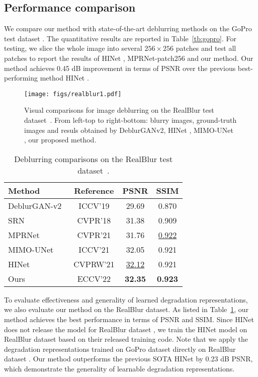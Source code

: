 \documentclass[runningheads]{llncs}
\begin{document}
\subsection{Performance comparison}


We compare our method with state-of-the-art deblurring methods \cite{HINet,Zamir2021MPRNet,MIMO_UNet} on the GoPro test dataset \cite{deblur-multi-scale}. The quantitative results are reported in Table~\ref{tb:gopro}.
For testing, we slice the whole image into several $256\times 256$ patches and test all patches to report the results of HINet \cite{HINet}, MPRNet-patch256 \cite{Zamir2021MPRNet} and our method.
Our method achieves 0.45 dB improvement in terms of PSNR over the previous best-performing method HINet \cite{HINet}. 
\begin{figure*}[t]
  \centering
   \texttt{[image: figs/realblur1.pdf]}
   \caption{Visual comparisons for image deblurring on the RealBlur test dataset~\cite{realblur}. From left-top to right-bottom: blurry images, ground-truth images and resuls obtained by DeblurGANv2, HINet \cite{HINet}, MIMO-UNet \cite{MIMO_UNet}, our proposed method.}
   \label{fig:realblur}
\end{figure*}
\begin{table}[t]
\centering
		\begin{tabular}{l|ccc}
			\hline
			Method & Reference & PSNR & SSIM \\  \hline
			DeblurGAN-v2~\cite{kupyn2019deblurgan} & ICCV'19 & 29.69 & 0.870 \\
			SRN~\cite{tao2018srndeblur} & CVPR'18 & 31.38 & 0.909 \\ 
			MPRNet~\cite{Zamir2021MPRNet} & CVPR'21 & 31.76 & \underline{0.922} \\
			MIMO-UNet \cite{MIMO_UNet} & ICCV'21  & 32.05 & 0.921 \\ 
			HINet \cite{HINet} & CVPRW'21  & \underline{32.12} & 0.921 \\ \hline
			Ours & ECCV'22 & \textbf{32.35}  & \textbf{0.923} \\ \hline
		\end{tabular}
	\caption{Deblurring comparisons on the RealBlur test dataset~\cite{realblur}. }
	\label{tb:realblur}
\end{table} To evaluate effectiveness and generality of learned degradation representations, we also evaluate our method on the RealBlur dataset. As listed in Table~\ref{tb:realblur}, our method achieves the best performance in terms of PSNR and SSIM. Since HINet \cite{HINet} does not release the model for RealBlur dataset \cite{realblur}, we train the HINet model on RealBlur dataset based on their released training code.
Note that we apply the degradation representations trained on GoPro dataset \cite{deblur-multi-scale} directly on RealBlur dataset \cite{realblur}.
Our method outperforms the previous SOTA HINet \cite{HINet} by 0.23 dB PSNR, which demonstrate the generality of learnable degradation representations.
\end{document}
